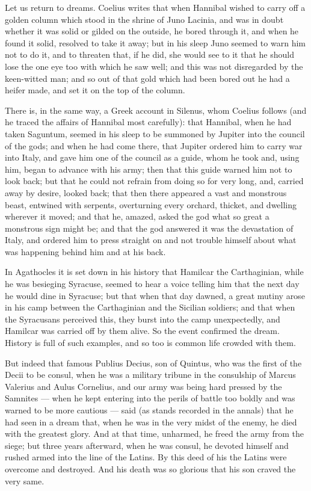  Let us return to dreams. Coelius writes that when Hannibal wished to carry off a golden column which stood in the shrine of Juno Lacinia, and was in doubt whether it was solid or gilded on the outside, he bored through it, and when he found it solid, resolved to take it away; but in his sleep Juno seemed to warn him not to do it, and to threaten that, if he did, she would see to it that he should lose the one eye too with which he saw well; and this was not disregarded by the keen-witted man; and so out of that gold which had been bored out he had a heifer made, and set it on the top of the column.

 There is, in the same way, a Greek account in Silenus, whom Coelius follows (and he traced the affairs of Hannibal most carefully): that Hannibal, when he had taken Saguntum, seemed in his sleep to be summoned by Jupiter into the council of the gods; and when he had come there, that Jupiter ordered him to carry war into Italy, and gave him one of the council as a guide, whom he took and, using him, began to advance with his army; then that this guide warned him not to look back; but that he could not refrain from doing so for very long, and, carried away by desire, looked back; that then there appeared a vast and monstrous beast, entwined with serpents, overturning every orchard, thicket, and dwelling wherever it moved; and that he, amazed, asked the god what so great a monstrous sign might be; and that the god answered it was the devastation of Italy, and ordered him to press straight on and not trouble himself about what was happening behind him and at his back.

 In Agathocles it is set down in his history that Hamilcar the Carthaginian, while he was besieging Syracuse, seemed to hear a voice telling him that the next day he would dine in Syracuse; but that when that day dawned, a great mutiny arose in his camp between the Carthaginian and the Sicilian soldiers; and that when the Syracusans perceived this, they burst into the camp unexpectedly, and Hamilcar was carried off by them alive. So the event confirmed the dream. History is full of such examples, and so too is common life crowded with them.

 But indeed that famous Publius Decius, son of Quintus, who was the first of the Decii to be consul, when he was a military tribune in the consulship of Marcus Valerius and Aulus Cornelius, and our army was being hard pressed by the Samnites — when he kept entering into the perils of battle too boldly and was warned to be more cautious — said (as stands recorded in the annals) that he had seen in a dream that, when he was in the very midst of the enemy, he died with the greatest glory. And at that time, unharmed, he freed the army from the siege; but three years afterward, when he was consul, he devoted himself and rushed armed into the line of the Latins. By this deed of his the Latins were overcome and destroyed. And his death was so glorious that his son craved the very same.

